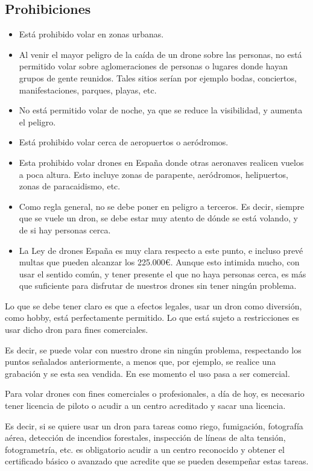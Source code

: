 \subsection{Prohibiciones}

\begin{itemize}
\item Está prohibido volar en zonas urbanas.
\item Al venir el mayor peligro de la caída de un drone sobre las personas, no está permitido volar sobre aglomeraciones de personas o lugares donde hayan grupos de gente reunidos. Tales sitios serían por ejemplo bodas, conciertos, manifestaciones, parques, playas, etc.
\item No está permitido volar de noche, ya que se reduce la visibilidad, y aumenta el peligro. 
\item Está prohibido volar cerca de aeropuertos o aeródromos.
\item Esta prohibido volar drones en España donde otras aeronaves realicen vuelos a poca altura. Esto incluye zonas de parapente, aeródromos, helipuertos, zonas de paracaidismo, etc.
\item Como regla general, no se debe poner en peligro a terceros. Es decir, siempre que se vuele un dron, se debe estar muy atento de dónde se está volando, y de si hay personas cerca.
\item La Ley de drones España es muy clara respecto a este punto, e incluso prevé multas que pueden alcanzar los 225.000€. Aunque esto intimida mucho, con usar el sentido común, y tener presente el que no haya personas cerca, es más que suficiente para disfrutar de nuestros drones sin tener ningún problema.
\end{itemize}

Lo que se debe tener claro es que a efectos legales, usar un dron como diversión, como hobby, está perfectamente permitido. Lo que está sujeto a restricciones  es usar dicho dron para fines comerciales.

Es decir, se puede volar con nuestro drone sin ningún problema, respectando los puntos señalados anteriormente, a menos que, por ejemplo,  se realice una grabación y se esta sea vendida. En ese momento el uso pasa a ser comercial.

Para volar drones con fines comerciales o profesionales, a día de hoy, es necesario tener licencia de piloto o acudir a un centro acreditado y sacar una licencia.

Es decir, si se quiere usar un dron para tareas como riego, fumigación, fotografía aérea, detección de incendios forestales, inspección de líneas de alta tensión,  fotogrametría, etc. es obligatorio acudir a un centro reconocido y obtener el certificado básico o avanzado que acredite que se pueden desempeñar estas tareas.

